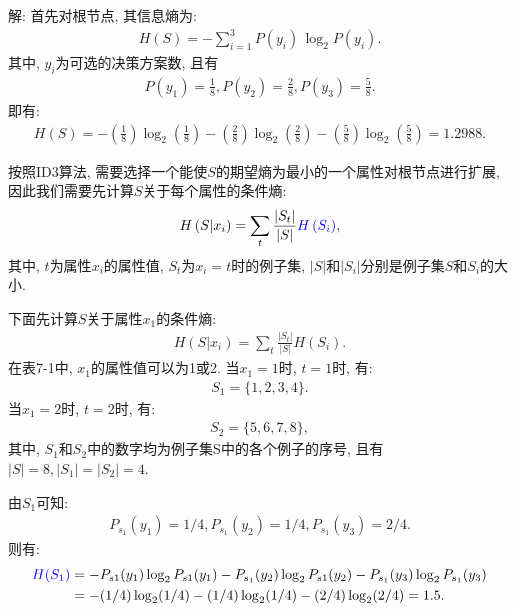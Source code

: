 解:  首先对根节点, 其信息熵为:
\begin{align}
    H(S)=-\sum_{i=1}^{3} P\left (y_{i}\right)\, \log_ {2} P\left (y_{i}\right).
\end{align}
其中, $y_i$为可选的决策方案数, 且有
\begin{align}
    P(y_1)=\frac 1 8, P (y_2)=\frac 2 8, P (y_3)=\frac 5 8.
\end{align}
即有:
\begin{align}
    H(S)= -\left (\frac 1 8\right)\log_2 \left (\frac 1 8\right)- \left (\frac 2 8\right)\log_ 2\left (\frac 2 8 \right)- \left (\frac 5 8\right)\log_ 2\left (\frac 5 8\right) =1.2988.
\end{align}

按照ID3算法, 需要选择一个能使$S$的期望熵为最小的一个属性对根节点进行扩展, 因此我们需要先计算$S$关于每个属性的条件熵:
\begin{align}\label{EntropyAIC67.7}
    H\left (S | x_{i}\right)=\sum_{t} \frac{\left|S_{t}\right|}{|S|} \textcolor[rgb]{0,0,1}{H\left (S_{i}\right)},
\end{align}
其中, $t$为属性$x_i$的属性值, $S_t$为$x_i=t$时的例子集, $|S|$和$|S_i|$分别是例子集$S$和$S_i$的大小.

下面先计算$S$关于属性$x_1$的条件熵:
\begin{align}
    H\left (S|x_{i}\right)=\sum_{t} \frac{\left|S_{t}\right|}{|S|} H\left (S_{i}\right).
\end{align}
在表7-1中, $x_1$的属性值可以为1或2. 当$x_1=1$时, $t=1$时, 有:
\begin{align}
    S_1=\{1, 2, 3, 4\}.
\end{align}
当$x_1=2$时, $t=2$时, 有:
\begin{align}
    S_2=\{5, 6, 7, 8\},
\end{align}
其中, $S_1$和$S_2$中的数字均为例子集S中的各个例子的序号, 且有$|S|=8,|S_1|=|S_2|=4$.

由$S_1$可知:
\begin{align}
    P_{s_1} (y_1)=1/4,     P_{s_1} (y_2)=1/4,     P_{s_1} (y_3)=2/4.
\end{align}
则有:
\begin{align}
    \textcolor[rgb]{0,0,1}{H (S_1)}&= - P_{s1} (y_1)\log_2 P_{s1} (y_1) - P_{s_1} (y_2)\log_2 P_{s1} (y_2 )- P_{s_1} (y_3)\log_2 P_{s_1} (y_3 )\notag\\
           &= - (1/4)\log_2 (1/4)- (1/4)\log_2 (1/4)- (2/4)\log_2 (2/4) =1.5.
\end{align}

